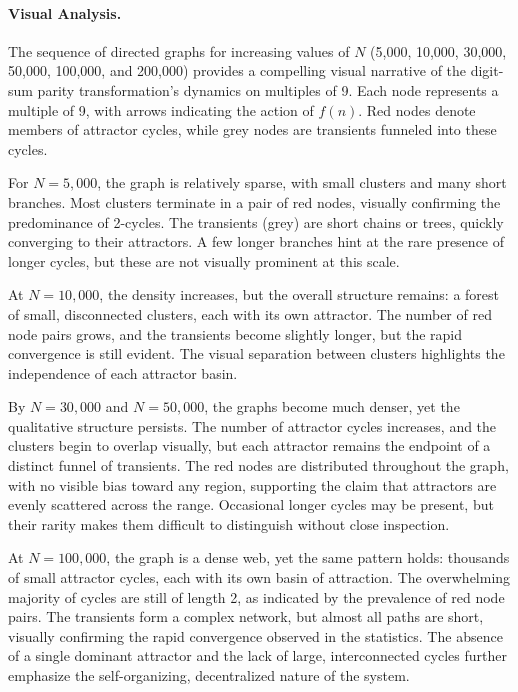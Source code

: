\documentclass[12pt]{article}
\begin{document}
\paragraph{Visual Analysis.}
The sequence of directed graphs for increasing values of $N$ (5,000, 10,000, 30,000, 50,000, 100,000, and 200,000) provides a compelling visual narrative of the digit-sum parity transformation's dynamics on multiples of 9. Each node represents a multiple of 9, with arrows indicating the action of $f(n)$. Red nodes denote members of attractor cycles, while grey nodes are transients funneled into these cycles.

For $N = 5,000$, the graph is relatively sparse, with small clusters and many short branches. Most clusters terminate in a pair of red nodes, visually confirming the predominance of 2-cycles. The transients (grey) are short chains or trees, quickly converging to their attractors. A few longer branches hint at the rare presence of longer cycles, but these are not visually prominent at this scale.

At $N = 10,000$, the density increases, but the overall structure remains: a forest of small, disconnected clusters, each with its own attractor. The number of red node pairs grows, and the transients become slightly longer, but the rapid convergence is still evident. The visual separation between clusters highlights the independence of each attractor basin.

By $N = 30,000$ and $N = 50,000$, the graphs become much denser, yet the qualitative structure persists. The number of attractor cycles increases, and the clusters begin to overlap visually, but each attractor remains the endpoint of a distinct funnel of transients. The red nodes are distributed throughout the graph, with no visible bias toward any region, supporting the claim that attractors are evenly scattered across the range. Occasional longer cycles may be present, but their rarity makes them difficult to distinguish without close inspection.

At $N = 100,000$, the graph is a dense web, yet the same pattern holds: thousands of small attractor cycles, each with its own basin of attraction. The overwhelming majority of cycles are still of length 2, as indicated by the prevalence of red node pairs. The transients form a complex network, but almost all paths are short, visually confirming the rapid convergence observed in the statistics. The absence of a single dominant attractor and the lack of large, interconnected cycles further emphasize the self-organizing, decentralized nature of the system.
\end{document}
